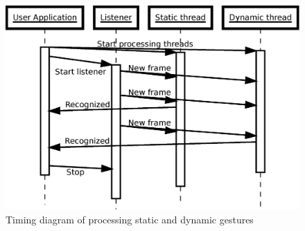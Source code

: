 \begin{figure}[htb]
\centering
 \includegraphics[width=0.8\columnwidth]{figures/timeline.eps}
 \caption[]{Timing diagram of processing static and dynamic gestures}
 \label{processingtimeline}
\end{figure}

